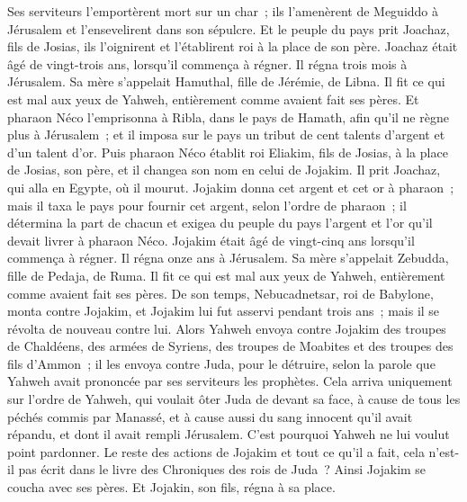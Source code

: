 \begin{multicols}{2}
Ses serviteurs l'emportèrent mort sur un char~; ils l'amenèrent de Meguiddo à Jérusalem et l'ensevelirent dans son sépulcre. Et le peuple du pays prit Joachaz, fils de Josias, ils l'oignirent et l'établirent roi à la place de son père.
Joachaz était âgé de vingt-trois ans, lorsqu'il commença à régner. Il régna trois mois à Jérusalem. Sa mère s'appelait Hamuthal, fille de Jérémie, de Libna.
Il fit ce qui est mal aux yeux de Yahweh, entièrement comme avaient fait ses pères.
Et pharaon Néco l'emprisonna à Ribla, dans le pays de Hamath, afin qu'il ne règne plus à Jérusalem~; et il imposa sur le pays un tribut de cent talents d'argent et d'un talent d'or.
Puis pharaon Néco établit roi Eliakim, fils de Josias, à la place de Josias, son père, et il changea son nom en celui de Jojakim. Il prit Joachaz, qui alla en Egypte, où il mourut.
Jojakim donna cet argent et cet or à pharaon~; mais il taxa le pays pour fournir cet argent, selon l'ordre de pharaon~; il détermina la part de chacun et exigea du peuple du pays l'argent et l'or qu'il devait livrer à pharaon Néco.
Jojakim était âgé de vingt-cinq ans lorsqu'il commença à régner. Il régna onze ans à Jérusalem. Sa mère s'appelait Zebudda, fille de Pedaja, de Ruma.
Il fit ce qui est mal aux yeux de Yahweh, entièrement comme avaient fait ses pères.
\VerseOne{}De son temps, Nebucadnetsar, roi de Babylone, monta contre Jojakim, et Jojakim lui fut asservi pendant trois ans~; mais il se révolta de nouveau contre lui.
Alors Yahweh envoya contre Jojakim des troupes de Chaldéens, des armées de Syriens, des troupes de Moabites et des troupes des fils d'Ammon~; il les envoya contre Juda, pour le détruire, selon la parole que Yahweh avait prononcée par ses serviteurs les prophètes.
Cela arriva uniquement sur l'ordre de Yahweh, qui voulait ôter Juda de devant sa face, à cause de tous les péchés commis par Manassé,
et à cause aussi du sang innocent qu'il avait répandu, et dont il avait rempli Jérusalem. C'est pourquoi Yahweh ne lui voulut point pardonner.
Le reste des actions de Jojakim et tout ce qu'il a fait, cela n'est-il pas écrit dans le livre des Chroniques des rois de Juda~?
Ainsi Jojakim se coucha avec ses pères. Et Jojakin, son fils, régna à sa place.

\end{multicols}
